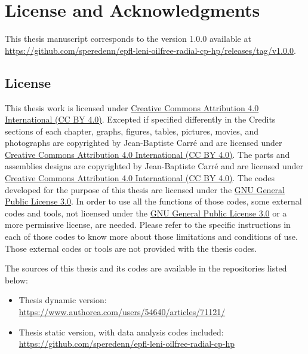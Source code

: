 \chapter{License and Acknowledgments}
\label{chap:licenses}

This thesis manuscript corresponds to the version 1.0.0 available at
\href{https://github.com/speredenn/epfl-leni-oilfree-radial-cp-hp/releases/tag/v1.0.0}{https://github.com/speredenn/epfl-leni-oilfree-radial-cp-hp/releases/tag/v1.0.0}.

\section*{License}
\label{sec:licenses}

This thesis work is licensed under
\href{http://creativecommons.org/licenses/by/4.0/}{Creative Commons
  Attribution 4.0 International (CC BY
  4.0)}. Excepted
if specified differently in the Credits sections of each chapter,
graphs, figures, tables, pictures, movies, and photographs are
copyrighted by Jean-Baptiste Carré and are licensed under
\href{http://creativecommons.org/licenses/by/4.0/}{Creative Commons
  Attribution 4.0 International (CC BY 4.0)}. The parts and assemblies
designs are copyrighted by Jean-Baptiste Carré and are licensed under
\href{http://creativecommons.org/licenses/by/4.0/}{Creative Commons
  Attribution 4.0 International (CC BY 4.0)}. The codes developed for
the purpose of this thesis are licensed under the
\href{http://www.gnu.org/licenses/gpl.html}{GNU General Public License
  3.0}. In order to use
all the functions of those codes, some external codes and tools, not
licensed under the \href{http://www.gnu.org/licenses/gpl.html}{GNU
  General Public License 3.0} or a more permissive license, are
needed. Please refer to the specific instructions in each of those
codes to know more about those limitations and conditions of
use. Those external codes or tools are not provided with the thesis
codes.

The sources of this thesis and its codes are available in the
repositories listed below:

\begin{itemize}
\item Thesis dynamic version:\\ \href{https://www.authorea.com/users/54640/articles/71121/}{https://www.authorea.com/users/54640/articles/71121/}
\item Thesis static version, with data analysis codes included:\\ \href{https://github.com/speredenn/epfl-leni-oilfree-radial-cp-hp}{https://github.com/speredenn/epfl-leni-oilfree-radial-cp-hp}
\end{itemize}

